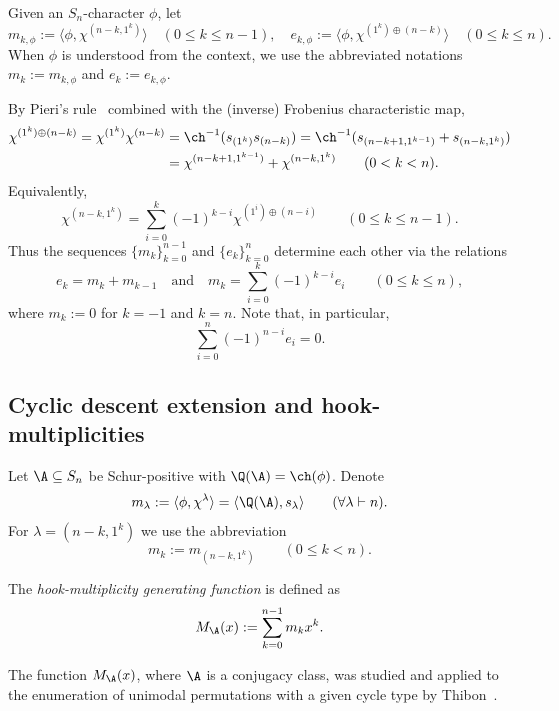 Given an $S_n$-character $\phi$, let  
\begin{equation}\label{e_k_interpretation1}
    m_{k,\phi}
    := \langle \phi,\chi^{(n-k,1^k)} \rangle 
    \quad (0 \le k \le n-1)
    , \quad
    e_{k,\phi} 
    :=\langle \phi,\chi^{(1^k)\oplus(n-k)} \rangle
    \quad (0 \le k \le n).
\end{equation}
When $\phi$ is understood from the context, we use the abbreviated notations $m_k:=m_{k,\phi}$ and $e_k:=e_{k,\phi}$.

By Pieri's rule~\cite[Theorem 7.5.17]{EC2} 
combined with the (inverse) Frobenius characteristic map,
\begin{align*}
    \chi^{(1^k)\oplus (n-k)} 
    = \chi^{(1^k)} \chi^{(n-k)}
    &= \ch^{-1}(s_{(1^k)}s_{(n-k)})
    = \ch^{-1}(s_{(n-k+1,1^{k-1})} + s_{(n-k,1^k)})\\
    &= \chi^{(n-k+1,1^{k-1})} + \chi^{(n-k,1^k)} 
    \qquad (0<k<n).
\end{align*}
Equivalently,
\[
    \chi^{(n-k,1^k)}=
    \sum_{i=0}^{k} (-1)^{k-i}\chi^{(1^i)\oplus (n-i)} \qquad (0\le k \le n-1).
\]
Thus the sequences $\{m_k\}_{k=0}^{n-1}$ and $\{e_k\}_{k=0}^{n}$ 
determine each other via the relations
\begin{equation}\label{eq:alternating}
    e_k = m_k + m_{k-1}
    \quad \text{and} \quad
    m_k = \sum_{i=0}^k (-1)^{k-i} e_i
    \qquad (0 \le k \le n),
\end{equation}
where $m_k := 0$ for $k = -1$ and $k = n$.
Note that, in particular,
\[
    \sum_{i=0}^{n} (-1)^{n-i} e_i = 0.
\]


\subsection{Cyclic descent extension and hook-multiplicities}\label{sec:hook_criterion}
	
Let $\A\subseteq S_n$ be Schur-positive with $\Q(\A) = \ch(\phi)$.
Denote
\[
    m_\lambda 
    := \langle \phi, \chi^\lambda \rangle 
    = \langle \Q(\A), s_\lambda \rangle
\qquad (\forall \lambda \vdash n).
\]
For $\lambda = (n-k,1^k)$ we use the abbreviation 
\[
m_k := m_{(n-k,1^k)} 
\qquad (0 \le k < n).
\]

The {\em hook-multiplicity generating function} is defined as 
\[
M_{\A}(x):=\sum_{k=0}^{n-1} m_k x^k.
\]

The function $M_{\A}(x)$, where $\A$ 
is a conjugacy class, 
was studied and applied to the enumeration of unimodal permutations with a given cycle type by Thibon~\cite{Thibon}. 

